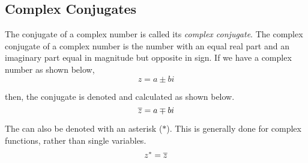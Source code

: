 \subsection{Complex Conjugates}\label{app:Complex_Conjugates}
\begin{definition}\label{def:Complex_Conjugate}
  The conjugate of a complex number is called its \emph{complex conjugate}.
  The complex conjugate of a complex number is the number with an equal real part and an imaginary part equal in magnitude but opposite in sign.
  If we have a complex number as shown below,
  \begin{equation*}
    z = a \pm bi
  \end{equation*}

  then, the conjugate is denoted and calculated as shown below.
  \begin{equation}\label{eq:Complex_Conjugates}
    \overline{z} = a \mp bi
  \end{equation}
\end{definition}

The  can also be denoted with an asterisk ($*$).
This is generally done for complex functions, rather than single variables.
\begin{equation}\label{eq:Complex_Conjugates_Asterisk}
  z^{*} = \overline{z}
\end{equation}

